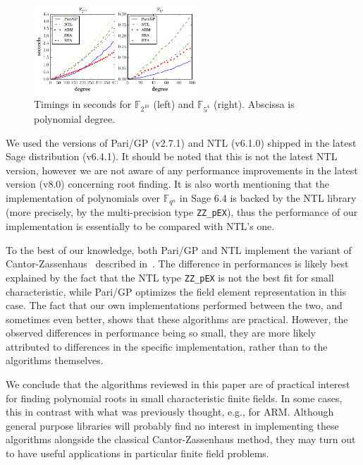 \documentclass{sig-alternate}
\newcommand{\ff}[1]{\mathbb{F}_{#1}}
\newcommand{\qq}{q}
\newcommand{\nn}{n}
\newcommand{\qn}{{\qq^\nn}}
\newcommand{\extf}{\ff{\qn}}
\newcounter{algo}
\begin{document}
\begin{figure}
  \hspace{-0.05\textwidth}
  \includegraphics[width=0.55\textwidth]{benchmark}
  \caption{Timings in seconds for $\ff{2^{10}}$ (left) and $\ff{5^4}$
    (right). Abscissa is polynomial degree.}
  \label{fig:benchmarks}
\end{figure}

We used the versions of Pari/GP (v2.7.1) and NTL (v6.1.0) shipped in
the latest Sage distribution (v6.4.1). It should be noted that this is
not the latest NTL version, however we are not aware of any
performance improvements in the latest version (v8.0) concerning root
finding. It is also worth mentioning that the implementation of
polynomials over $\extf$ in Sage 6.4 is backed by the NTL library
(more precisely, by the multi-precision type \texttt{ZZ\_pEX}), thus
the performance of our implementation is essentially to be compared
with NTL's one.

To the best of our knowledge, both Pari/GP and NTL implement the
variant of Cantor-Zassenhaus~\cite{cantor1981} described
in~\cite{GathenS92}. The difference in performances is likely best
explained by the fact that the NTL type \texttt{ZZ\_pEX} is not the
best fit for small characteristic, while Pari/GP optimizes the field
element representation in this case. The fact that our own
implementations performed between the two, and sometimes even better,
shows that these algorithms are practical. However, the observed
differences in performance being so small, they are more likely
attributed to differences in the specific implementation, rather than
to the algorithms themselves.

We conclude that the algorithms reviewed in this paper are of
practical interest for finding polynomial roots in small
characteristic finite fields. In some cases, this in contrast with
what was previously thought, e.g., for ARM. Although general purpose
libraries will probably find no interest in implementing these
algorithms alongside the classical Cantor-Zassenhaus method, they may
turn out to have useful applications in particular finite field
problems.
\end{document}
